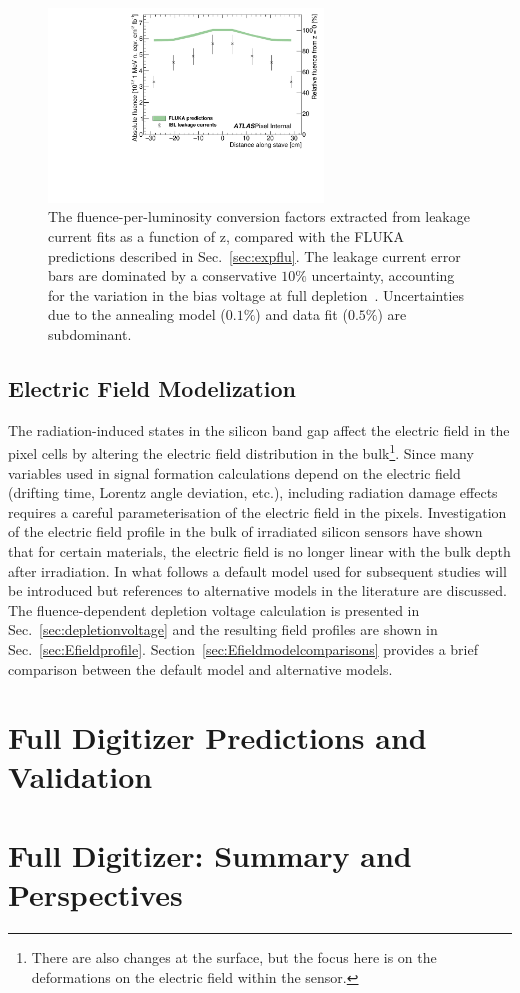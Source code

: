 \begin{figure}[h!]
\centering
\includegraphics[width=0.65\textwidth]{simulation-FLUKA-absolute.pdf}
\caption{The fluence-per-luminosity conversion factors extracted from leakage current fits as a function of z, compared with the FLUKA predictions described in Sec.~\ref{sec:expflu}. The leakage current error bars are dominated by a conservative $10\%$ uncertainty, accounting for the variation in the bias voltage at full depletion~\cite{ATL-INDET-PUB-2014-006}.  Uncertainties due to the annealing model ($0.1\%$) and data fit ($0.5\%$) are subdominant.}
\label{fig:leackagecurrent:eta}
\end{figure}

\subsection{Electric Field Modelization}
The radiation-induced states in the silicon band gap affect the electric field in the pixel cells by altering 
the electric field distribution in the bulk\footnote{There are also changes at the surface, but the focus 
here is on the deformations on the electric field within the sensor.}. Since many variables used in signal 
formation calculations depend on the electric field (drifting time, Lorentz angle deviation, etc.), including 
radiation damage effects requires a careful parameterisation of the electric field in the pixels. 
Investigation of the electric field profile in the bulk of irradiated silicon sensors have shown that for 
certain materials, the electric field is no longer linear with the bulk depth after irradiation.  
In what follows a default model used for subsequent 
studies will be introduced but references to alternative models in the literature are discussed.   The fluence-dependent 
depletion voltage calculation is presented in Sec.~\ref{sec:depletionvoltage} and the resulting field 
profiles are shown in Sec.~\ref{sec:Efieldprofile}.  Section~\ref{sec:Efieldmodelcomparisons} provides a 
brief comparison between the default model and alternative models.

\section{Full Digitizer Predictions and Validation}
\label{sec:digivalidation}

\section{Full Digitizer: Summary and Perspectives}
\label{sec:digiconclusions}
